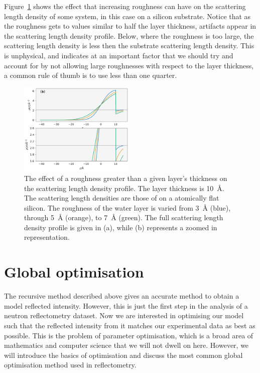 \documentclass[
 reprint,
 superscriptaddress,
 amsmath,amssymb,
 aps,
]{revtex4-1}
\begin{document}
Figure~\ref{fig:rough} shows the effect that increasing roughness can have on the scattering length density of some system, in this case  on a silicon substrate. 
Notice that as the roughness gets to values similar to half the layer thickness, artifacts appear in the scattering length density profile. 
Below, where the roughness is too large, the scattering length density is less then the substrate scattering length density. 
This is unphysical, and indicates at an important factor that we should try and account for by not allowing large roughnesses with respect to the layer thickness, a common rule of thumb is to use less than one quarter. 
%
\begin{figure}[t]
    \includegraphics[width=0.49\textwidth]{roughness}
    \caption{The effect of a roughness greater than a given layer's thickness on the scattering length density profile. The layer thickness is \SI{10}{\angstrom}. The scattering length densities are those of  on a atomically flat silicon. The roughness of the water layer is varied from \SI{3}{\angstrom} (blue), through \SI{5}{\angstrom} (orange), to \SI{7}{\angstrom} (green). The full scattering length density profile is given in (a), while (b) represents a zoomed in representation.}
    \label{fig:rough}
\end{figure}
%

\section{Global optimisation}
The recursive method described above gives an accurate method to obtain a model reflected intensity. 
However, this is just the first step in the analysis of a neutron reflectometry dataset. 
Now we are interested in optimising our model such that the reflected intensity from it matches our experimental data as best as possible. 
This is the problem of parameter optimisation, which is a broad area of mathematics and computer science that we will not dwell on here. 
However, we will introduce the basics of optimisation and discuss the most common global optimisation method used in reflectometry. 
\end{document}

